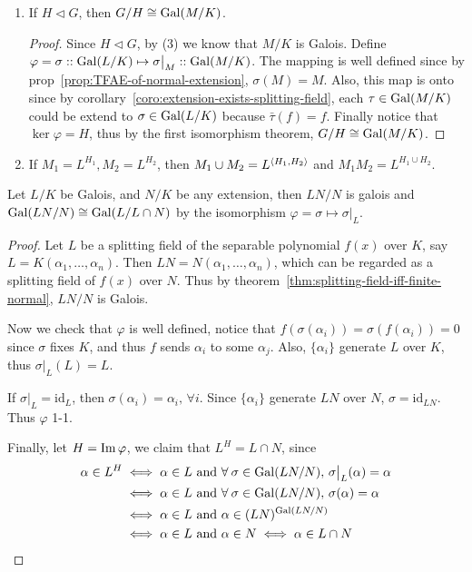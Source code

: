 \begin{theorem}
\begin{enumerate}[(\arabic*)]
    \item If $H \lhd G$, then $G / H \cong \operatorname{Gal}(M/K)$.
      \begin{proof}
        Since $H \lhd G$, by (3) we know that $M/K$ is Galois. Define $\varphi = \sigma :: \operatorname{Gal}(L/K)
        \mapsto \sigma\big|_M :: \operatorname{Gal}(M/K)$. The mapping is well defined
        since by prop~\ref{prop:TFAE-of-normal-extension}, $\sigma(M) = M$.
        Also, this map is onto since by corollary~\ref{coro:extension-exists-splitting-field},
        each $\tau \in \operatorname{Gal}(M/K)$ could be extend to $\sigma \in \operatorname{Gal}(L/K)$ because
        $\bar\tau(f) = f$. Finally notice that $\ker \varphi = H$, thus by the
        first isomorphism theorem, $G/H \cong \operatorname{Gal}(M/K)$.
      \end{proof}

    \item If $M_1 = L^{H_1}, M_2 = L^{H_2}$, then $M_1 \cup M_2 = L^{\langle H_1, H_2\rangle}$ and
      $M_1 M_2 = L^{H_1 \cup H_2}$.
  \end{enumerate}
\end{theorem}

\begin{theorem}
  Let $L/K$ be Galois, and $N/K$ be any extension, then $LN / N$ is galois and
  $\operatorname{Gal}({LN}/{N}) \cong \operatorname{Gal}({L}/{L \cap N})$ by the isomorphism
  $\varphi = \sigma \mapsto \sigma\big|_L$.

  \begin{proof}
    Let $L$ be a splitting field of the separable polynomial $f(x)$ over $K$,
    say $L = K(\alpha_1, \dots, \alpha_n)$. Then $LN = N(\alpha_1, \dots, \alpha_n)$,
    which can be regarded as a splitting field of $f(x)$ over $N$.
    Thus by theorem~\ref{thm:splitting-field-iff-finite-normal}, $LN/N$ is Galois.

    Now we check that $\varphi$ is well defined, notice that $f(\sigma(\alpha_i))
    = \sigma(f(\alpha_i)) = 0$ since $\sigma$ fixes $K$, and thus $f$ sends $\alpha_i$
    to some $\alpha_j$. Also, $\{ \alpha_i \}$ generate $L$ over $K$, thus $\sigma\big|_L(L) = L$.

    If $\sigma\big|_L = \text{id}_L$, then $\sigma(\alpha_i) = \alpha_i, \, \forall i$.
    Since $\{\alpha_i\}$ generate $LN$ over $N$, $\sigma = \text{id}_{LN}$. Thus $\varphi$ 1-1.

    Finally, let $H = \operatorname{Im} \varphi$, we claim that $L^H = L \cap N$, since
      \begin{align*}
        \alpha \in L^H &\iff \alpha \in L \text{ and } \forall \sigma \in \Gal(LN/N),\, \sigma\big|_L(\alpha) = \alpha \\
        &\iff \alpha \in L \text{ and } \forall \sigma \in \Gal(LN/N),\, \sigma(\alpha) = \alpha \\
        &\iff \alpha \in L \text{ and } \alpha \in (LN)^{\Gal(LN/N)} \\
        &\iff \alpha \in L \text{ and } \alpha \in N \iff \alpha \in L \cap N
      \end{align*}
  \end{proof}
\end{theorem}

